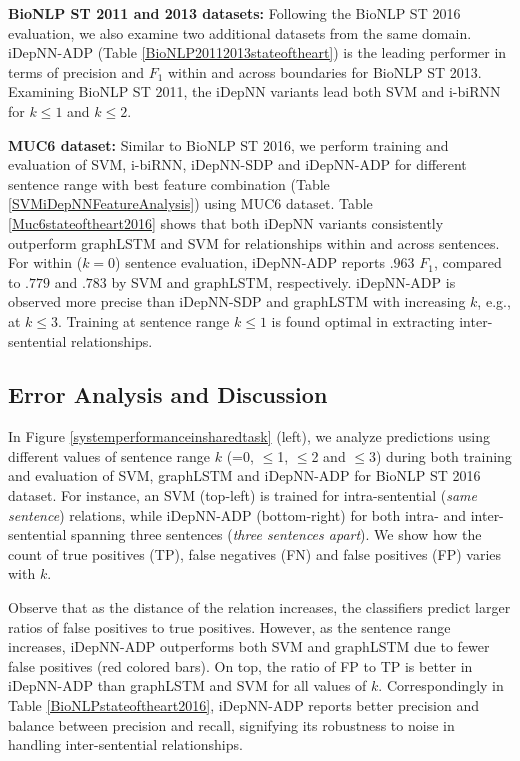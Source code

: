 \documentclass[letterpaper]{article} \usepackage{aaai19}  \usepackage{times}  \usepackage{helvet}  \usepackage{courier}  \usepackage{url}  \usepackage{graphicx}
\begin{document}
{\bf BioNLP ST 2011 and 2013 datasets:} Following the BioNLP ST 2016 evaluation, 
we also examine two additional datasets from the same domain.   
iDepNN-ADP (Table \ref{BioNLP20112013stateoftheart}) is the leading performer in terms of precision and $F_1$ within and across boundaries for BioNLP ST 2013. 
Examining BioNLP ST 2011, the iDepNN variants lead both SVM and i-biRNN for $k \le 1$ and   $k \le 2$. 

{\bf MUC6 dataset:} Similar to BioNLP ST 2016, we perform training and evaluation of SVM, i-biRNN, iDepNN-SDP and iDepNN-ADP for different sentence range with best feature combination (Table \ref{SVMiDepNNFeatureAnalysis})
using MUC6 dataset.   
Table \ref{Muc6stateoftheart2016} shows that both iDepNN variants consistently outperform graphLSTM and SVM for relationships  
within and across sentences. For within ($k$$=$$0$) sentence evaluation, iDepNN-ADP reports $.963$ $F_1$, compared to $.779$ and $.783$ by SVM and graphLSTM, respectively. 
iDepNN-ADP is observed more precise than iDepNN-SDP and graphLSTM with increasing $k$, e.g., at $k$$\le$$3$. 
Training at sentence range $k$$\le$$1$  is found optimal in extracting inter-sentential relationships. 

\subsection{Error Analysis and Discussion}\label{erroranalysis}
In Figure \ref{systemperformanceinsharedtask} (left), we analyze predictions using different values of sentence range $k$ (=0, $\le$1, $\le$2 and $\le$3) during both training and evaluation of SVM, graphLSTM and iDepNN-ADP for BioNLP ST 2016 dataset.  
For instance, an SVM (top-left) is trained for intra-sentential ({\it same sentence}) relations, while iDepNN-ADP (bottom-right) for both intra- and inter-sentential spanning three sentences ({\it three sentences apart}).  
We show how the count of true positives (TP), false negatives (FN) and false positives (FP) varies with $k$. 

Observe that as the distance of the relation increases, the classifiers predict larger ratios of false positives to true positives. 
However, as the sentence range increases, iDepNN-ADP outperforms both SVM and graphLSTM due to fewer false positives (red colored bars).  
On top, the ratio of FP to TP is better in iDepNN-ADP than graphLSTM and SVM for all values of $k$. 
Correspondingly in Table \ref{BioNLPstateoftheart2016}, iDepNN-ADP reports better  precision and balance between precision and recall, signifying its robustness to noise
 in handling inter-sentential relationships.  
\end{document}
